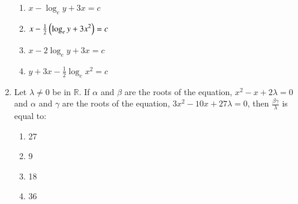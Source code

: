 \documentclass[journal]{IEEEtran}
\begin{document}
\begin{enumerate}
		\begin{enumerate}
			\item $x - \log_{e}{y+3x} = c$
			\item $x - \frac{1}{2}\left({\log_{e}{y+3x}}^2\right) = c$
			\item $x - 2\log_{e}{y+3x} = c$
			\item $y + 3x - \frac{1}{2}\log_{e}{x}^{2} = c$
		\end{enumerate}
	\item 
	Let $\lambda \neq 0$ be in $\mathbb{R}$. If $\alpha$ and $\beta$ are the roots of the equation, $x^{2}-x+2\lambda = 0$ and $\alpha$ and $\gamma$ are the roots of the equation, $3x^{2}-10x+27\lambda = 0$, then $\frac{\beta\gamma}{\lambda}$ is equal to:
		\begin{enumerate}
			\item 27
			\item 9
			\item 18
			\item 36
		\end{enumerate}
\end{enumerate}
\end{document}
